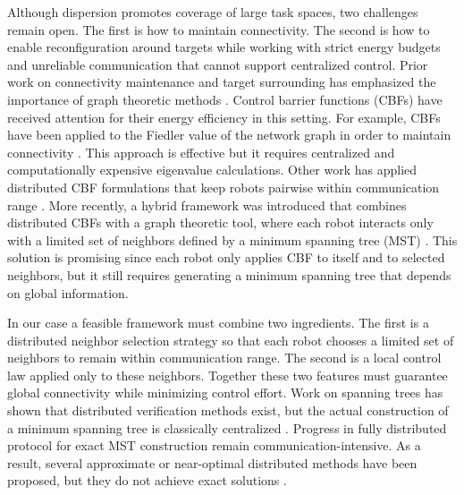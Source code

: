 \documentclass[conference]{IEEEconf}
\theoremstyle{plain}
\begin{document}
Although dispersion promotes coverage of large task spaces, two challenges remain open. The first is how to maintain connectivity. The second is how to enable reconfiguration around targets while working with strict energy budgets and unreliable communication that cannot support centralized control. Prior work on connectivity maintenance and target surrounding has emphasized the importance of graph theoretic methods \cite{olfati2007,dimartino2006}. Control barrier functions (CBFs) have received attention for their energy efficiency in this setting. For example, CBFs have been applied to the Fiedler value of the network graph in order to maintain connectivity \cite{capelli2020}. This approach is effective but it requires centralized and computationally expensive eigenvalue calculations. Other work has applied distributed CBF formulations that keep robots pairwise within communication range \cite{sabattini2013,capelli2021}. More recently, a hybrid framework was introduced that combines distributed CBFs with a graph theoretic tool, where each robot interacts only with a limited set of neighbors defined by a minimum spanning tree (MST) \cite{yang2023}. This solution is promising since each robot only applies CBF to itself and to selected neighbors, but it still requires generating a minimum spanning tree that depends on global information.

In our case a feasible framework must combine two ingredients. The first is a distributed neighbor selection strategy so that each robot chooses a limited set of neighbors to remain within communication range. The second is a local control law applied only to these neighbors. Together these two features must guarantee global connectivity while minimizing control effort. Work on spanning trees has shown that distributed verification methods exist, but the actual construction of a minimum spanning tree is classically centralized \cite{boruvka1926, kruskal1956, prim1957}. Progress in fully distributed protocol for exact MST construction \cite{gallager1983, awerbuch1987} remain communication-intensive. As a result, several approximate or near-optimal distributed methods have been proposed, but they do not achieve exact solutions \cite{khan2008}.
\end{document}
